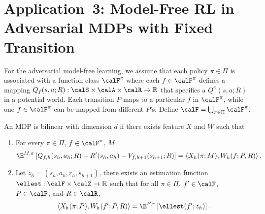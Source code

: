 





\section{Application~3: Model-Free RL in Adversarial MDPs with Fixed Transition}
For the adversarial model-free learning, we assume that each policy $\pi\in\Pi$ is associated with a function class $\calF^\pi$ where each $f\in\calF^\pi$ defines a mapping $Q_{f}(s,a;R): \calS\times\calA\times\calR\to \mathbb{R}$ that specifies a $Q^\pi(s,a;R)$ in a potential world. Each transition $P$ maps to a particular $f$ in $\calF^\pi$, while one $f\in\calF^\pi$ can be mapped from different $P$'s. Define $\calF=\bigcup_{\pi\in\Pi}\calF^\pi$. 

\begin{definition}
An MDP is bilinear with dimension $d$ if there exists feature $X$ and $W$ such that
\begin{enumerate}
    \item For every $\pi\in\Pi$, $f \in \calF^\pi$, $M$
    \begin{align*}
        \E^{M,\pi}\left[Q_{f,h}(s_h,a_h;R) - R'(s_h, a_h) - V_{f,h+1}(s_{h+1}; R)\right] = \left\langle X_h(\pi;M), W_h(f;P,R) \right\rangle.
    \end{align*}
    \item Let $z_h = (s_h, a_h, r_h, s_{h+1})$, there exists an estimation function $\ellest: \calF \times \calZ \rightarrow \mathbb{R}$ such that for all $\pi\in \Pi$, $f'\in \calF$, $P\in\calP$, and $R\in\calR$, 
    \begin{align*}
        \left\langle X_h(\pi;P), W_h(f';P,R) \right\rangle = \E^{P, \pi}\left[\ellest(f';z_h)\right].
    \end{align*}
\end{enumerate}
\end{definition}

